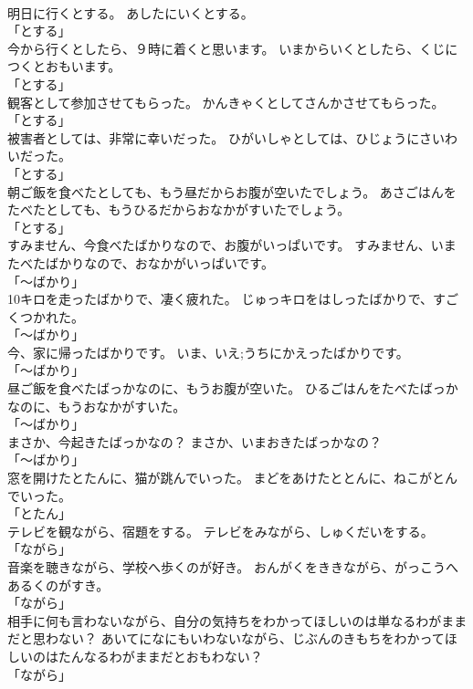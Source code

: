 \documentclass[8pt]{extreport}
\begin{document}
\begin{CJK}{UTF8}{min}
\\	明日に行くとする。	あしたにいくとする。	
\\	「とする」	
\\	今から行くとしたら、９時に着くと思います。	いまからいくとしたら、くじにつくとおもいます。	
\\	「とする」	
\\	観客として参加させてもらった。	かんきゃくとしてさんかさせてもらった。	
\\	「とする」	
\\	被害者としては、非常に幸いだった。	ひがいしゃとしては、ひじょうにさいわいだった。	
\\	「とする」	
\\	朝ご飯を食べたとしても、もう昼だからお腹が空いたでしょう。	あさごはんをたべたとしても、もうひるだからおなかがすいたでしょう。	
\\	「とする」	
\\	すみません、今食べたばかりなので、お腹がいっぱいです。	すみません、いまたべたばかりなので、おなかがいっぱいです。	
\\	「～ばかり」	
\\	10キロを走ったばかりで、凄く疲れた。	じゅっキロをはしったばかりで、すごくつかれた。	
\\	「～ばかり」	
\\	今、家に帰ったばかりです。	いま、{いえ;うち}にかえったばかりです。	
\\	「～ばかり」	
\\	昼ご飯を食べたばっかなのに、もうお腹が空いた。	ひるごはんをたべたばっかなのに、もうおなかがすいた。	
\\	「～ばかり」	
\\	まさか、今起きたばっかなの？	まさか、いまおきたばっかなの？	
\\	「～ばかり」	
\\	窓を開けたとたんに、猫が跳んでいった。	まどをあけたととんに、ねこがとんでいった。	
\\	「とたん」 
\\	テレビを観ながら、宿題をする。	テレビをみながら、しゅくだいをする。	
\\	「ながら」 
\\	音楽を聴きながら、学校へ歩くのが好き。	おんがくをききながら、がっこうへあるくのがすき。	
\\	「ながら」 
\\	相手に何も言わないながら、自分の気持ちをわかってほしいのは単なるわがままだと思わない？	あいてになにもいわないながら、じぶんのきもちをわかってほしいのはたんなるわがままだとおもわない？	
\\	「ながら」 

\end{CJK}
\end{document}
